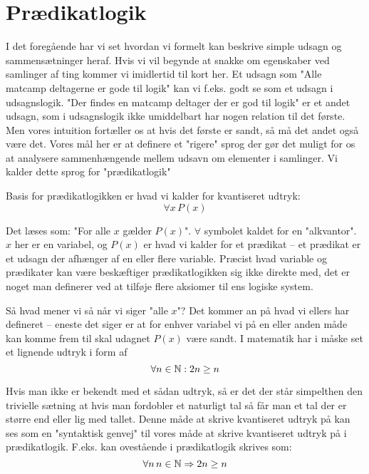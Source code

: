 \ifx\preampleIncluded\undefined
\def\startPraedikatlogik{}


\fi

\section{Prædikatlogik}
I det foregående har vi set hvordan vi formelt kan beskrive simple udsagn og sammensætninger heraf. Hvis vi vil begynde at snakke om egenskaber ved samlinger af ting kommer vi imidlertid til kort her. Et udsagn som "Alle matcamp deltagerne er gode til logik" kan vi f.eks. godt se som et udsagn i udsagnslogik. "Der findes en matcamp deltager der er god til logik" er et andet udsagn, som i udsagnslogik ikke umiddelbart har nogen relation til det første. Men vores intuition fortæller os at hvis det første er sandt, så må det andet også være det. Vores mål her er at definere et "rigere" sprog der gør det muligt for os at analysere sammenhængende mellem udsavn om elementer i samlinger. Vi kalder dette sprog for "prædikatlogik"

Basis for prædikatlogikken er hvad vi kalder for kvantiseret udtryk:
\[
	\forall x \, P(x)
\]

Det læses som: "For alle $x$ gælder $P(x)$". $\forall$ symbolet kaldet for en "alkvantor". $x$ her er en variabel, og $P(x)$ er hvad vi kalder for et prædikat -- et prædikat er et udsagn der afhænger af en eller flere variable. Præcist hvad variable og prædikater kan være beskæftiger prædikatlogikken sig ikke direkte med, det er noget man definerer ved at tilføje flere aksiomer til ens logiske system.

Så hvad mener vi så når vi siger "alle $x$"? Det kommer an på hvad vi ellers har defineret -- eneste det siger er at for enhver variabel vi på en eller anden måde kan komme frem til skal udagnet $P(x)$ være sandt. I matematik har i måske set et lignende udtryk i form af
\[
	\forall n \in \mathbb{N} : 2n \geq n
\]

Hvis man ikke er bekendt med et sådan udtryk, så er det der står simpelthen den trivielle sætning at hvis man fordobler et naturligt tal så får man et tal der er større end eller lig med tallet. Denne måde at skrive kvantiseret udtryk på kan ses som en "syntaktisk genvej" til vores måde at skrive kvantiseret udtryk på i prædikatlogik. F.eks. kan ovestående i prædikatlogik skrives som: 
\[
	\forall n \, n \in \mathbb{N} \Rightarrow 2n \geq n
\]

